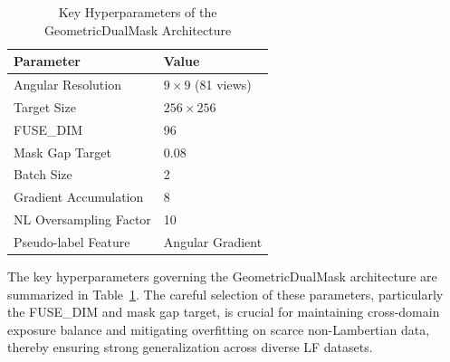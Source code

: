 \documentclass[lettersize,journal]{IEEEtran}
\begin{document}
\begin{table}[!t]
\caption{Key Hyperparameters of the GeometricDualMask Architecture}
\label{tab:hyperparams}
\centering
\begin{tabular}{@{}ll@{}}
\toprule
\textbf{Parameter} & \textbf{Value} \\
\midrule
Angular Resolution & $9 \times 9$ (81 views) \\
Target Size & $256 \times 256$ \\
FUSE\_DIM & 96 \\
Mask Gap Target & 0.08 \\
Batch Size & 2 \\
Gradient Accumulation & 8 \\
NL Oversampling Factor & 10 \\
Pseudo-label Feature & Angular Gradient \\
\bottomrule
\end{tabular}
\end{table}

The key hyperparameters governing the GeometricDualMask architecture are summarized in Table~\ref{tab:hyperparams}. The careful selection of these parameters, particularly the FUSE\_DIM and mask gap target, is crucial for maintaining cross-domain exposure balance and mitigating overfitting on scarce non-Lambertian data, thereby ensuring strong generalization across diverse LF datasets.
\end{document}
